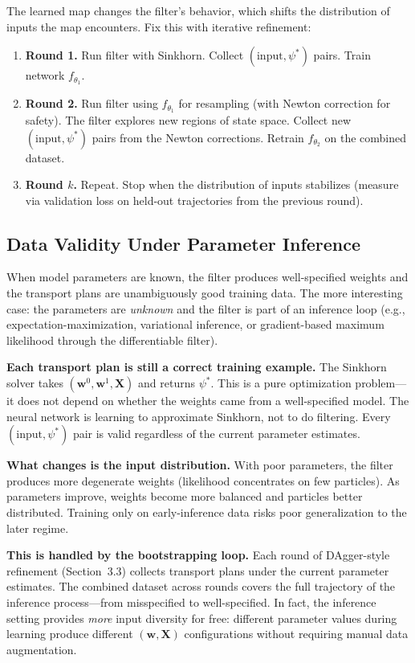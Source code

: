 \documentclass[11pt]{article}
\newcommand{\bw}{\mathbf{w}}
\newcommand{\bX}{\mathbf{X}}
\begin{document}
The learned map changes the filter's behavior, which shifts the distribution of inputs the map encounters. Fix this with iterative refinement:
\begin{enumerate}[nosep,leftmargin=1.5em]
    \item \textbf{Round 1.} Run filter with Sinkhorn. Collect $(\text{input}, \psi^*)$ pairs. Train network $f_{\theta_1}$.
    \item \textbf{Round 2.} Run filter using $f_{\theta_1}$ for resampling (with Newton correction for safety). The filter explores new regions of state space. Collect new $(\text{input}, \psi^*)$ pairs from the Newton corrections. Retrain $f_{\theta_2}$ on the combined dataset.
    \item \textbf{Round $k$.} Repeat. Stop when the distribution of inputs stabilizes (measure via validation loss on held-out trajectories from the previous round).
\end{enumerate}

\subsection{Data Validity Under Parameter Inference}

When model parameters are known, the filter produces well-specified weights and the transport plans are unambiguously good training data. The more interesting case: the parameters are \emph{unknown} and the filter is part of an inference loop (e.g., expectation-maximization, variational inference, or gradient-based maximum likelihood through the differentiable filter).

\textcolor{keypoint}{\textbf{Each transport plan is still a correct training example.}} The Sinkhorn solver takes $(\bw^0, \bw^1, \bX)$ and returns $\psi^*$. This is a pure optimization problem---it does not depend on whether the weights came from a well-specified model. The neural network is learning to approximate Sinkhorn, not to do filtering. Every $(\text{input}, \psi^*)$ pair is valid regardless of the current parameter estimates.

\textbf{What changes is the input distribution.} With poor parameters, the filter produces more degenerate weights (likelihood concentrates on few particles). As parameters improve, weights become more balanced and particles better distributed. Training only on early-inference data risks poor generalization to the later regime.

\textbf{This is handled by the bootstrapping loop.} Each round of DAgger-style refinement (Section~3.3) collects transport plans under the current parameter estimates. The combined dataset across rounds covers the full trajectory of the inference process---from misspecified to well-specified. In fact, the inference setting provides \emph{more} input diversity for free: different parameter values during learning produce different $(\bw, \bX)$ configurations without requiring manual data augmentation.
\end{document}

